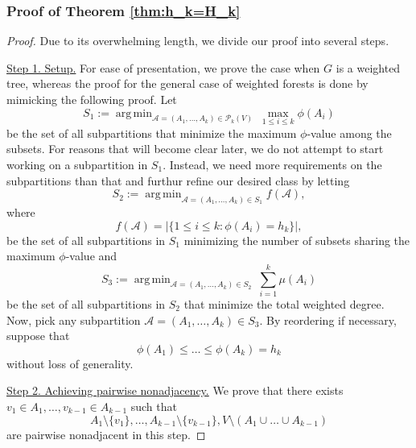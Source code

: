 \documentclass[12pt, reqno]{article}
\DeclareMathOperator*{\argmin}{arg\,min}
\begin{document}
\subsubsection{Proof of Theorem \ref{thm:h_k=H_k}}
\begin{proof}
Due to its overwhelming length, we divide our proof into several steps.

\vspace{0.3cm}

\noindent\underline{Step 1. Setup.}
\newline\noindent For ease of presentation, we prove the case when $G$ is a weighted tree, whereas the proof for the general case of weighted forests is done by mimicking the following proof. Let \[S_1:=\argmin_{\mathcal A=(A_1,\dots,A_k)\in\mathcal{P}_k(V)}~\max_{1\le i\le k}\phi(A_i)\] be the set of all subpartitions that minimize the maximum $\phi$-value among the subsets. For reasons that will become clear later, we do not attempt to start working on a subpartition in $S_1$. Instead, we need more requirements on the subpartitions than that and furthur refine our desired class by letting \[S_2:=\argmin_{\mathcal A=(A_1,\dots,A_k)\in S_1}f(\mathcal A),\] where \[f(\mathcal A)=|\{1\le i\le k\colon\phi(A_i)=h_k\}|,\] be the set of all subpartitions in $S_1$ minimizing the number of subsets sharing the maximum $\phi$-value and \[S_3:=\argmin_{\mathcal A=(A_1,\dots,A_k)\in S_2}~\sum_{i=1}^k\mu(A_i)\] be the set of all subpartitions in $S_2$ that minimize the total weighted degree. Now, pick any subpartition $\mathcal A=(A_1,\dots,A_k)\in S_3$. By reordering if necessary, suppose that \[\phi(A_1)\le\dots\le\phi(A_k)=h_k\] without loss of generality.

\vspace{0.3cm}

\noindent\underline{Step 2. Achieving pairwise nonadjacency.}
\newline\noindent We prove that there exists $v_1\in A_1,\dots,v_{k-1}\in A_{k-1}$ such that \[A_1\setminus\{v_1\},\dots,A_{k-1}\setminus\{v_{k-1}\},V\setminus(A_1\cup\dots\cup A_{k-1})\] are pairwise nonadjacent in this step.


\end{proof}
\end{document}
